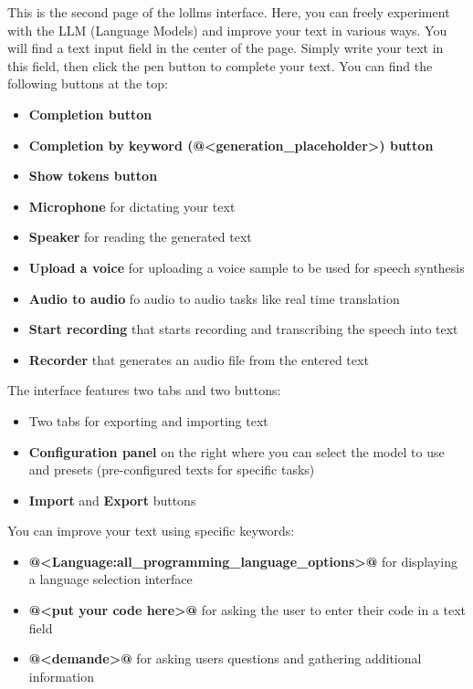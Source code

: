 \documentclass{article}
\begin{document}
This is the second page of the lollms interface. Here, you can freely experiment with the LLM (Language Models) and improve your text in various ways. You will find a text input field in the center of the page. Simply write your text in this field, then click the pen button to complete your text. You can find the following buttons at the top:
\begin{itemize}[noitemsep,topsep=0pt]
\item \textbf{Completion button}
\item \textbf{Completion by keyword (@<generation_placeholder>) button}
\item \textbf{Show tokens button}
\item \textbf{Microphone} for dictating your text
\item \textbf{Speaker} for reading the generated text
\item \textbf{Upload a voice} for uploading a voice sample to be used for speech synthesis
\item \textbf{Audio to  audio} fo audio to audio tasks like real time translation
\item \textbf{Start recording} that starts recording and transcribing the speech into text
\item \textbf{Recorder} that generates an audio file from the entered text
\end{itemize}

The interface features two tabs and two buttons:
\begin{itemize}[noitemsep,topsep=0pt]
\item Two tabs for exporting and importing text
\item \textbf{Configuration panel} on the right where you can select the model to use and presets (pre-configured texts for specific tasks)
\item \textbf{Import} and \textbf{Export} buttons
\end{itemize}

You can improve your text using specific keywords:
\begin{itemize}[noitemsep,topsep=0pt]
\item \textbf{@<Language:all_programming_language_options>@} for displaying a language selection interface
\item \textbf{@<put your code here>@} for asking the user to enter their code in a text field
\item \textbf{@<demande>@} for asking users questions and gathering additional information
\end{itemize}
\end{document}
